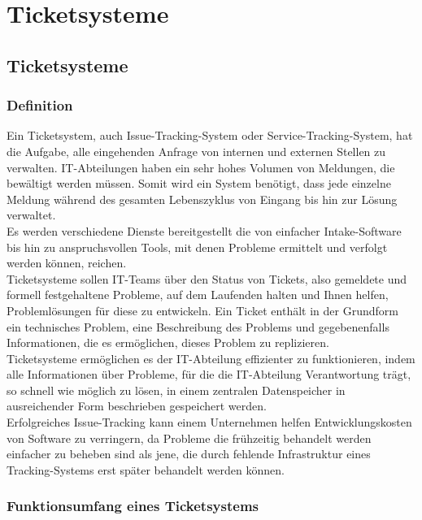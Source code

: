\chapter{Ticketsysteme}
\reiter

  \section{Ticketsysteme}
  
  \subsection{Definition}
    Ein Ticketsystem, auch Issue-Tracking-System oder Service-Tracking-System, hat die Aufgabe, alle eingehenden Anfrage von internen und externen Stellen zu verwalten. IT-Abteilungen haben ein sehr hohes Volumen von Meldungen, die bewältigt werden müssen. Somit wird ein System benötigt, dass jede einzelne Meldung während des gesamten Lebenszyklus von Eingang bis hin zur Lösung verwaltet. \\
Es werden verschiedene Dienste bereitgestellt die von einfacher Intake-Software bis hin zu anspruchsvollen Tools, mit denen Probleme ermittelt und verfolgt werden können, reichen. \\
Ticketsysteme sollen IT-Teams über den Status von Tickets, also gemeldete und formell festgehaltene Probleme, auf dem Laufenden halten und Ihnen helfen, Problemlösungen für diese zu entwickeln. 
Ein Ticket enthält in der Grundform ein technisches Problem, eine Beschreibung des Problems und gegebenenfalls Informationen, die es ermöglichen, dieses Problem zu replizieren. \\
Ticketsysteme ermöglichen es der IT-Abteilung effizienter zu funktionieren, indem alle Informationen über Probleme, für die die IT-Abteilung Verantwortung trägt, so schnell wie möglich zu lösen, in einem zentralen Datenspeicher in ausreichender Form beschrieben gespeichert werden. \\
Erfolgreiches Issue-Tracking kann einem Unternehmen helfen Entwicklungskosten von Software zu verringern, da Probleme die frühzeitig behandelt werden einfacher zu beheben sind als jene, die durch fehlende Infrastruktur eines Tracking-Systems erst später behandelt werden können. \\
  
  \subsection{Funktionsumfang eines Ticketsystems}
  
